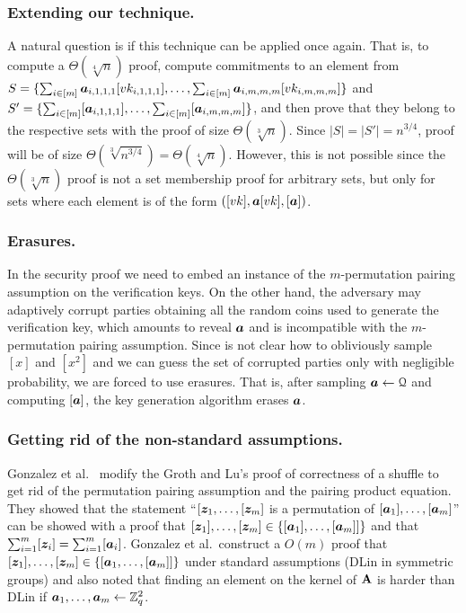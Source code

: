 \subsubsection{Extending our technique.}
A natural question is if this technique can be applied once again. That is, to compute a $\Theta(\sqrt[4]{n})$  proof, compute commitments to an element from $S=\{\sum_{i\in[m]}{\boldsymbol{a}}_{i,1,1,1}[vk_{i,1,1,1}],\ldots,\sum_{i\in[m]}{\boldsymbol{a}}_{i,m,m,m}[vk_{i,m,m,m}]\}$ and $S'=\allowbreak\{\sum_{i\in[m]}[{\boldsymbol{a}}_{i,1,1,1}],\ldots,\sum_{i\in[m]}[{\boldsymbol{a}}_{i,m,m,m}]\}$, and then prove that they belong to the respective sets with the proof of size $\Theta(\sqrt[3]{n})$. Since $|S|=|S'|=n^{3/4}$, proof will be of size $\Theta(\sqrt[3]{n^{3/4}})=\Theta(\sqrt[4]{n})$. However, this is not possible since the $\Theta(\sqrt[3]{n})$ proof is not a set membership proof for arbitrary sets, but only for sets where each element is of the form $([vk],{\boldsymbol{a}}[vk],[{\boldsymbol{a}}])$.


\subsubsection{Erasures.}
In the security proof we need to embed an instance of the $m$-permutation pairing assumption on the verification keys. On the other hand, the adversary may adaptively corrupt parties obtaining all the random coins used to generate the verification key, which amounts to reveal ${\boldsymbol{a}}$ and is incompatible with the $m$-permutation pairing assumption. Since is not clear how to obliviously sample $[x]$ and $[x^{2}]$ and we can guess the set of corrupted parties only with negligible probability, we are forced to use erasures. That is, after sampling ${\boldsymbol{a}}\gets\mathcal{Q}$ and computing $[{\boldsymbol{a}}]$, the key generation algorithm erases ${\boldsymbol{a}}$.

\subsubsection{Getting rid of the non-standard assumptions.} Gonzalez et al.~\cite{ACNS:GonRaf16} modify the Groth and Lu's proof of correctness of a shuffle \cite{AC:GroLu07} to get rid of the permutation pairing assumption and the pairing product equation. They showed that the statement ``$[{\boldsymbol{z}}_1,\ldots,[{\boldsymbol{z}}_m]$ is a permutation of $[{\boldsymbol{a}}_1],\ldots,[{\boldsymbol{a}}_m]$'' can be showed with a proof that $[{\boldsymbol{z}}_1],\ldots,[{\boldsymbol{z}}_m]\in\{[{\boldsymbol{a}}_1],\ldots,[{\boldsymbol{a}}_m]]\}$ and that $\sum_{i=1}^m [{\boldsymbol{z}}_i]=\sum_{i=1}^m [{\boldsymbol{a}}_i]$.  Gonzalez et al.~construct a $O(m)$ proof that $[{\boldsymbol{z}}_1],\ldots,[{\boldsymbol{z}}_m]\in\{[{\boldsymbol{a}}_1,\ldots,[{\boldsymbol{a}}_m]]\}$ under standard assumptions (DLin in symmetric groups)  and also noted that finding an element on the kernel of $\mathbf{{A}}$ is harder than DLin if ${\boldsymbol{a}}_1,\ldots,{\boldsymbol{a}}_m\gets\mathbb{Z}_q^2$.

